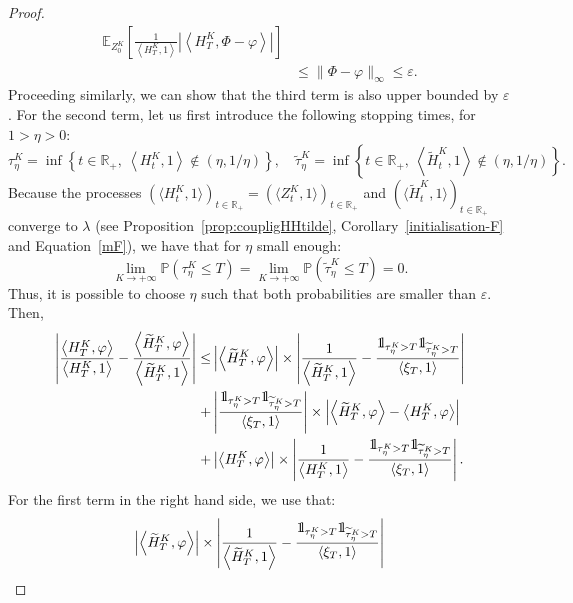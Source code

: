 \documentclass[10pt]{amsart}
\theoremstyle{definition}\newtheorem{defi}[theo]{Definition}\newtheorem{rema}[theo]{Remark}\newtheorem{exam}[theo]{Example}\newtheorem{exem}[theo]{Example}\newtheorem{nota}[theo]{Notation}
\renewcommand*\P{\mathbb{P}}
\newcommand*\R{\mathbb{R}}
\newcommand*\E{\mathbb{E}}
\newcommand*\ind{{\mathchoice {\rm 1\mskip-4mu l} {\rm 1\mskip-4mu l} {\rm 1\mskip-4.5mu l} {\rm 1\mskip-5mu l}}}
\begin{document}
\begin{proof}
\begin{align*}
\E_{Z^K_0}\left[\frac{1}{\left\langle H^K_T,1\right\rangle} \left| \left\langle H^K_T,\Phi-\varphi\right\rangle\right|\right]\\
&\leq \|\Phi-\varphi\|_\infty \leq \varepsilon.
\end{align*}
Proceeding similarly, we can show that the third term is also upper bounded by $\varepsilon$. For the second term, let us first introduce the following stopping times, for ${1>}\eta>0$:
\[
\tau^K_\eta=\inf\left\{t\in \R_+,\ \left\langle H^K_t,1\right\rangle \notin (\eta,1/\eta)\right\},\quad
\widetilde{\tau}^K_\eta=\inf\left\{t\in \R_+,\ \left\langle \widetilde{H}^K_t,1\right\rangle \notin (\eta,1/\eta)\right\}.
\]
Because the processes $(\langle H^K_t,1\rangle)_{t \in \R_+}=(\langle Z^K_t,1\rangle)_{t \in \R_+}$ and $(\langle \widetilde{H}^K_t,1\rangle)_{t \in \R_+}$ converge {to $\lambda$ (see Proposition~\ref{prop:coupligHHtilde}, Corollary~\ref{initialisation-F} and Equation~\eqref{mF})}, we have that for $\eta$ small enough:
\[
\lim_{K\rightarrow +\infty}\P\left(\tau^K_\eta\leq T\right)=\lim_{K \rightarrow +\infty}\P\left(\widetilde{\tau}^K_\eta\leq T\right)=0.
\]
Thus, it is possible to choose $\eta$ such that both probabilities are smaller than $\varepsilon$. Then,
\begin{align*}
\left| \frac{\left\langle H^K_T,\varphi\right\rangle}{\left\langle H^K_T,1\right\rangle}-\frac{\left\langle \widetilde{H}^K_T,\varphi\right\rangle}{\left\langle \widetilde{H}^K_T,1\right\rangle}\right| \leq &
\left|\left\langle \widetilde{H}^K_T,\varphi\right\rangle \right| \times \left|\frac{1}{\left\langle \widetilde{H}^K_T,1\right\rangle }- \frac{\ind_{\tau^K_\eta > T}\ind_{\widetilde{\tau}^K_\eta > T}}{\left\langle \xi_T,1\right\rangle }\right|\\
+ & \left|\frac{\ind_{\tau^K_\eta > T}\ind_{\widetilde{\tau}^K_\eta > T}}{\left\langle \xi_T,1\right\rangle}\right| \times \left|\left\langle \widetilde{H}^K_T,\varphi\right\rangle - \left\langle H^K_T,\varphi\right\rangle \right|\\
+ & \left|\left\langle H^K_T,\varphi\right\rangle \right| \times \left|\frac{1}{\left\langle {H}^K_T,1\right\rangle }- \frac{\ind_{\tau^K_\eta > T}\ind_{\widetilde{\tau}^K_\eta > T}}{\left\langle \xi_T,1\right\rangle }\right|.
\end{align*}
For the first term in the right hand side, we use that:
\begin{multline*}
\left|\left\langle \widetilde{H}^K_T,\varphi\right\rangle \right| \times \left|\frac{1}{\left\langle \widetilde{H}^K_T,1\right\rangle }- \frac{\ind_{\tau^K_\eta > T}\ind_{\widetilde{\tau}^K_\eta > T}}{\left\langle \xi_T,1\right\rangle}\right|\\

\end{multline*}
\end{proof}
\end{document}
